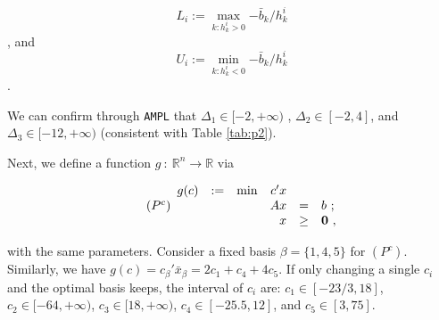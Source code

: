$$L_i := \max_{k:h_k^i>0} {-\bar{b}_k/h_k^i}$$, and $$U_i := \min_{k:h_k^i<0} {-\bar{b}_k/h_k^i}$$.

We can confirm through {\tt AMPL} that $\Delta_1 \in [-2,+\infty)$ , $\Delta_2 \in [-2,4]$, and $\Delta_3 \in [-12,+\infty)$ (consistent with Table \ref{tab:p2}).

Next, we define a function $g~:~\mathbb{R}^n \rightarrow \mathbb{R}$ via

\[
\tag{$P^{c}$}
\begin{array}{ccrrcl}
g(c) & := & \min & c'x  &      &   \\
   &&   &  Ax  &   =  & b~; \\
   &&   &   x  & \geq & \mathbf{0}~,
\end{array}
\]

with the same parameters. Consider a fixed basis $\beta = \{1,4,5\}$ for $(P^{c})$. Similarly, we have $g(c) = c_\beta'\bar{x}_\beta = 2c_1+c_4+4c_5$. If only changing a single $c_i$ and the optimal basis keeps, the interval of $c_i$ are: $c_1\in [-23/3,18]$, $c_2\in[-64,+\infty)$, $c_3\in[18, +\infty)$, $c_4\in[-25.5,12]$, and $c_5\in[3,75]$.
